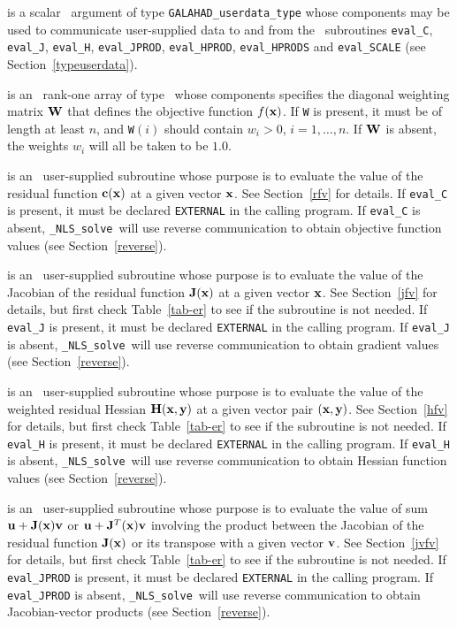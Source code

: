 \documentclass{galahad}
\newcommand{\packagename}{NLS}
\newcommand{\fullpackagename}{\libraryname\_\packagename}
\newcommand{\solver}{{\tt \fullpackagename\_solve}}
\begin{document}
\begin{description}
 is a scalar \intentinout\ argument of type
{\tt GALAHAD\_userdata\_type} whose components may be used
to communicate user-supplied data to and from the \optional\ subroutines
{\tt eval\_C}, {\tt eval\_J}, {\tt eval\_H}, {\tt eval\_JPROD},
{\tt eval\_HPROD}, {\tt eval\_HPRODS} and {\tt eval\_SCALE}
(see Section~\ref{typeuserdata}).

 is an \optional\ rank-one array of type \realdp\
whose components specifies the diagonal weighting matrix ${\mathbf{W}}$ that
defines the objective function $f({\mathbf{x}})$. If {\tt W} is present, it
must be of length at least $n$, and {\tt W}$(i)$ should contain $w_i > 0$,
$i = 1, \ldots, n$. If ${\mathbf{W}}$ is absent, the weights $w_i$ will all be
taken to be $1.0$.

 is an \optional\
user-supplied subroutine whose purpose is to evaluate the value of the
residual function ${\mathbf{c}}({\mathbf{x}})$ at a given vector ${\mathbf{x}}$.
See Section~\ref{rfv} for details.
If {\tt eval\_C} is present,
it must be declared {\tt EXTERNAL} in the calling program.
If {\tt eval\_C} is absent, \solver\ will use reverse communication to
obtain objective function values (see Section~\ref{reverse}).

 is an \optional\
user-supplied subroutine whose purpose is to evaluate the value of the
Jacobian of the residual function ${\mathbf{J}}({\mathbf{x}})$ at a given vector ${\mathbf{x}}$.
See Section~\ref{jfv} for details,
but first check Table~\ref{tab-er} to see if the subroutine is not needed.
If {\tt eval\_J} is present,
it must be declared {\tt EXTERNAL} in the calling program.
If {\tt eval\_J} is absent, \solver\ will use reverse communication to
obtain gradient values (see Section~\ref{reverse}).

\itt{eval\_H} is an \optional\
user-supplied subroutine whose purpose is to evaluate the value of the
weighted residual Hessian ${\mathbf{H}}({\mathbf{x}},{\mathbf{y}})$ at a given vector pair
$({\mathbf{x}},{\mathbf{y}})$. See Section~\ref{hfv} for details,
but first check Table~\ref{tab-er} to see if the subroutine is not needed.
If {\tt eval\_H} is present,
it must be declared {\tt EXTERNAL} in the calling program.
If {\tt eval\_H} is absent, \solver\ will use reverse communication to
obtain Hessian function values (see Section~\ref{reverse}).

\itt{eval\_JPROD} is an \optional\
user-supplied subroutine whose purpose is to evaluate the value of sum
${\mathbf{u}} + {\mathbf{J}}({\mathbf{x}}){\mathbf{v}}$ or ${\mathbf{u}} + {\mathbf{J}}^T({\mathbf{x}}){\mathbf{v}}$ involving the
product between the Jacobian of the
residual function ${\mathbf{J}}({\mathbf{x}})$ or its transpose with a given vector ${\mathbf{v}}$.
See Section~\ref{jvfv} for details,
but first check Table~\ref{tab-er} to see if the subroutine is not needed.
If {\tt eval\_JPROD} is present,
it must be declared {\tt EXTERNAL} in the calling program.
If {\tt eval\_JPROD} is absent, \solver\ will use reverse communication to
obtain Jacobian-vector products (see Section~\ref{reverse}).


\end{description}
\end{document}
